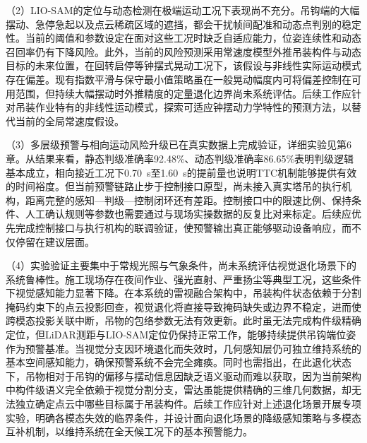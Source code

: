 （2）LIO-SAM的定位与动态检测在极端运动工况下表现尚不充分。吊钩端的大幅摆动、急停急起以及点云稀疏区域的遮挡，都会干扰帧间配准和动态点判别的稳定性。当前的阈值和参数设定在面对这些工况时缺乏自适应能力，位姿连续性和动态召回率仍有下降风险。此外，当前的风险预测采用常速度模型外推吊装构件与动态目标的未来位置，在回转启停等钟摆式晃动工况下，该假设与非线性实际运动模式存在偏差。现有指数平滑与保守最小值策略虽在一般晃动幅度内可将偏差控制在可用范围，但持续大幅摆动时外推精度的定量退化边界尚未系统评估。后续工作应针对吊装作业特有的非线性运动模式，探索可适应钟摆动力学特性的预测方法，以替代当前的全局常速度假设。

（3）多层级预警与相向运动风险升级已在真实数据上完成验证，详细实验见第6章。从结果来看，静态判级准确率92.48\%、动态判级准确率86.65\%表明判级逻辑基本成立，相向接近工况下0.70~s至1.60~s的提前量也说明TTC机制能够提供有效的时间裕度。但当前预警链路止步于控制接口原型，尚未接入真实塔吊的执行机构，距离完整的感知—判级—控制闭环还有差距。控制接口中的限速比例、保持条件、人工确认规则等参数也需要通过与现场实操数据的反复比对来标定。后续应优先完成控制接口与执行机构的联调验证，使预警输出真正能够驱动设备响应，而不仅停留在建议层面。

（4）实验验证主要集中于常规光照与气象条件，尚未系统评估视觉退化场景下的系统鲁棒性。施工现场存在夜间作业、强光直射、严重扬尘等典型工况，这些条件下视觉感知能力显著下降。在本系统的雷视融合架构中，吊装构件状态依赖于分割掩码约束下的点云投影回查，视觉退化将直接导致掩码缺失或边界不稳定，进而使跨模态投影关联中断，吊物的包络参数无法有效更新。此时虽无法完成构件级精确定位，但LiDAR测距与LIO-SAM定位仍保持正常工作，能够持续提供吊钩端位姿作为预警基准。当视觉分支因环境退化而失效时，几何感知层仍可独立维持系统的基本空间感知能力，确保预警系统不会完全瘫痪。同时也需指出，在此退化状态下，吊物相对于吊钩的偏移与摆动信息因缺乏语义驱动而难以获取，因为当前架构中构件级语义完全依赖于视觉分割分支，雷达虽能提供精确的三维几何数据，却无法独立确定点云中哪些目标属于吊装构件。后续工作应针对上述退化场景开展专项实验，明确各模态失效的临界条件，并设计面向退化场景的降级感知策略与多模态互补机制，以维持系统在全天候工况下的基本预警能力。

